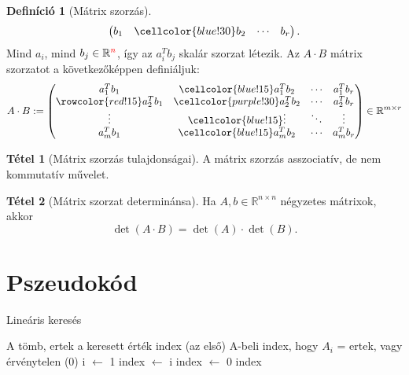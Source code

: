 \documentclass[twocolumn]{report}
\theoremstyle{definition} %
\newtheorem{tet}{Tétel}
\newtheorem{defin}{Definíció} %
\begin{document}
\begin{defin}[Mátrix szorzás]
{\[\begin{pmatrix}
b_1 & \cellcolor{blue!30} b_2 & \cdots & b_r 
\end{pmatrix}. \]
}
Mind $a_i$, mind $b_j \in \mathbb{R}^{\textcolor{red}{n}}$, így az $a_i^T b_j$ skalár szorzat létezik. 
Az $A \cdot B$ mátrix szorzatot a következőképpen definiáljuk:
\begin{equation}
A \cdot B := \begin{pmatrix}
a_1^T b_1 & \cellcolor{blue!15}a_1^T b_2 & \cdots & a_1^T b_r \\
\rowcolor{red!15} a_2^T b_1 & \cellcolor{purple!30}a_2^T b_2 & \cdots & a_2^T b_r \\
\vdots & \cellcolor{blue!15}\vdots & \ddots & \vdots \\
a_m^T b_1 & \cellcolor{blue!15}a_m^T b_2 & \cdots & a_m^T b_r 
\end{pmatrix}
\in \mathbb{R}^{m \times r}
\end{equation}
\end{defin}

\begin{tet}[Mátrix szorzás tulajdonságai]
A mátrix szorzás asszociatív, de nem kommutatív művelet.
\end{tet}

\begin{tet}[Mátrix szorzat determinánsa]
Ha $A,b\in \mathbb{R}^{n\times n}$ négyzetes mátrixok,
akkor
\begin{equation}
\det(A\cdot B) = \det(A) \cdot \det(B).
\end{equation}
\end{tet}

\chapter{Pszeudokód}

\hulipsum[1]

\begin{algorithm} %
\caption{Lineáris keresés}
\begin{algorithmic}[3] %
\Require A tömb, ertek a keresett érték
\Ensure index (az első) A-beli index, hogy $A_i$ = ertek, vagy érvénytelen (0)
\State i $\gets$ 1 %
\State {} %
\EndWhile %
\State index $\gets$ i
\Else
\State index $\gets$ 0
\EndIf
\State \Return index
\EndProcedure
\end{algorithmic}
\end{algorithm}
\end{document}
